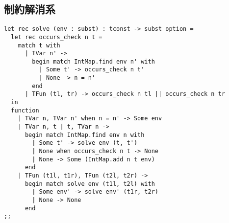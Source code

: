 \subsection{制約解消系}

\begin{lstlisting}[caption=方程式を解く関数, label=list:ocaml-stlc-solve]
let rec solve (env : subst) : tconst -> subst option =
  let rec occurs_check n t =
    match t with
      | TVar n' ->
        begin match IntMap.find env n' with
          | Some t' -> occurs_check n t'
          | None -> n = n'
        end
      | TFun (tl, tr) -> occurs_check n tl || occurs_check n tr
  in
  function
    | TVar n, TVar n' when n = n' -> Some env
    | TVar n, t | t, TVar n ->
      begin match IntMap.find env n with
        | Some t' -> solve env (t, t')
        | None when occurs_check n t -> None
        | None -> Some (IntMap.add n t env)
      end
    | TFun (t1l, t1r), TFun (t2l, t2r) ->
      begin match solve env (t1l, t2l) with
        | Some env' -> solve env' (t1r, t2r)
        | None -> None
      end
;;
\end{lstlisting}

